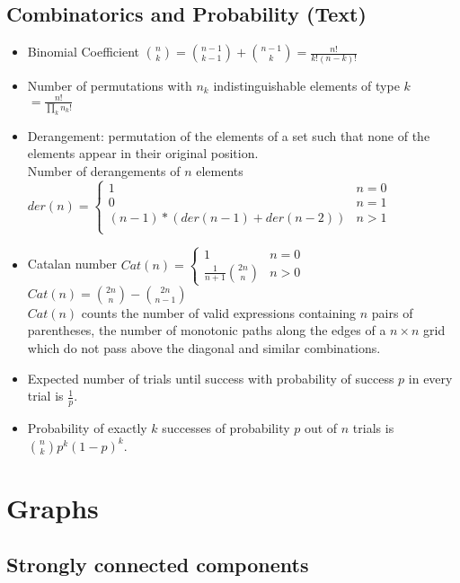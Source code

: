 \documentclass[9pt]{extarticle}
\begin{document}
\begin{multicols*}{3}
\subsection{Combinatorics and Probability (Text)}
\begin{itemize}
\item Binomial Coefficient $\binom{n}{k} = \binom{n - 1}{k - 1} + \binom{n - 1}{k} = \frac{n!}{k!(n - k)!}$
\item Number of permutations with $n_k$ indistinguishable elements of type $k$ $ = \frac{n!}{\prod_{k}n_k!}$
\item Derangement: permutation of the elements of a set such that none of the elements appear in their original position. \\
Number of derangements of $n$ elements \\
$der(n) = \begin{cases}
1 & \text{$n = 0$} \\
0 & \text{$n = 1$} \\
(n - 1) * (der(n - 1) + der(n - 2)) & \text{$n > 1$} \\
\end{cases}$
\item Catalan number $Cat(n) = \begin{cases}
1 & \text{$n = 0$} \\
\frac{1}{n + 1}\binom{2n}{n} & \text{$n > 0$}
\end{cases}$ \\
$Cat(n) = \binom{2n}{n} - \binom{2n}{n - 1}$ \\
$Cat(n)$ counts the number of valid expressions containing $n$ pairs of parentheses,
the number of monotonic paths along the edges of a $n \times n$ grid which do not pass above the diagonal
and similar combinations.
\item Expected number of trials until success with probability of success $p$ in every trial is $\frac{1}{p}$.
\item Probability of exactly $k$ successes of probability $p$ out of $n$ trials is $\binom{n}{k}p^k(1 - p)^k$.
\end{itemize}

\section{Graphs}

\subsection{Strongly connected components} %



\end{multicols*}
\end{document}
